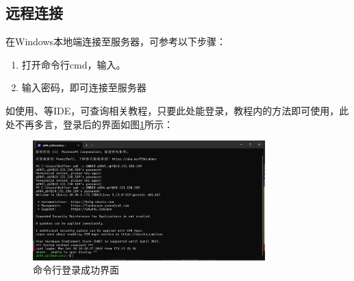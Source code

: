 \documentclass{article}
\begin{document}
\subsection{远程连接}
在Windows本地端连接至服务器，可参考以下步骤：
\begin{enumerate}
  \item 打开命令行cmd，输入。
  \item 输入密码，即可连接至服务器
\end{enumerate}
如使用、等IDE，可查询相关教程，只要此处能登录，教程内的方法即可使用，此处不再多言，登录后的界面如图\ref{fig:成功登录界面}所示：
\begin{figure}[H]
  \centering
  \includegraphics[width=0.8\textwidth]{成功登录界面.png}
  \caption{命令行登录成功界面}
  \label{fig:成功登录界面}
\end{figure}
\end{document}

